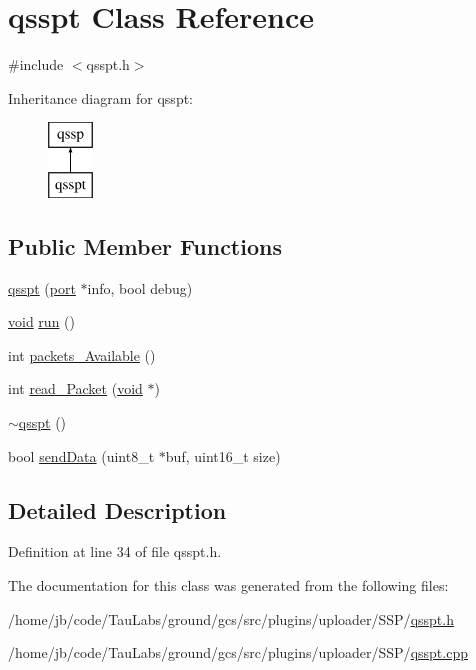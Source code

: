 \hypertarget{classqsspt}{\section{qsspt \-Class \-Reference}
\label{classqsspt}
}


{\ttfamily \#include $<$qsspt.\-h$>$}

\-Inheritance diagram for qsspt\-:\begin{figure}[H]
\begin{center}
\leavevmode
\includegraphics[height=2.000000cm]{classqsspt}
\end{center}
\end{figure}
\subsection*{\-Public \-Member \-Functions}
\begin{DoxyCompactItemize}
\item 
\hyperlink{group___uploader_gaa7e3f69818d5f701e1c7191059b332ae}{qsspt} (\hyperlink{classport}{port} $\ast$info, bool debug)
\item 
\hyperlink{group___u_a_v_objects_plugin_ga444cf2ff3f0ecbe028adce838d373f5c}{void} \hyperlink{group___uploader_gac7b338eecc56ca930c6078162b168c83}{run} ()
\item 
int \hyperlink{group___uploader_ga4fd481f6796cd770176f43ddc097ebe8}{packets\-\_\-\-Available} ()
\item 
int \hyperlink{group___uploader_gab8eb0ccb0806be7a169c335cab1e4d0c}{read\-\_\-\-Packet} (\hyperlink{group___u_a_v_objects_plugin_ga444cf2ff3f0ecbe028adce838d373f5c}{void} $\ast$)
\item 
\hyperlink{group___uploader_ga05f94a4538efa2bacd837e2b0684d6b3}{$\sim$qsspt} ()
\item 
bool \hyperlink{group___uploader_ga7711ea10887bffa2d338e45bfdd564a2}{send\-Data} (uint8\-\_\-t $\ast$buf, uint16\-\_\-t size)
\end{DoxyCompactItemize}


\subsection{\-Detailed \-Description}


\-Definition at line 34 of file qsspt.\-h.



\-The documentation for this class was generated from the following files\-:\begin{DoxyCompactItemize}
\item 
/home/jb/code/\-Tau\-Labs/ground/gcs/src/plugins/uploader/\-S\-S\-P/\hyperlink{qsspt_8h}{qsspt.\-h}\item 
/home/jb/code/\-Tau\-Labs/ground/gcs/src/plugins/uploader/\-S\-S\-P/\hyperlink{qsspt_8cpp}{qsspt.\-cpp}\end{DoxyCompactItemize}
